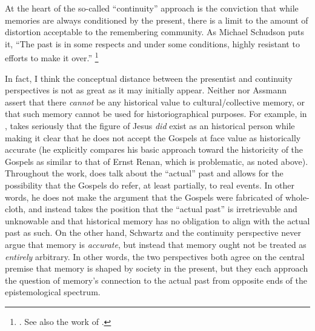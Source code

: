 At the heart of the so-called ``continuity'' approach is the conviction that while memories are always conditioned by the present, there is a limit to the amount of distortion acceptable to the remembering community. As Michael Schudson puts it, ``The past is in some respects and under some conditions, highly resistant to efforts to make it over.''%
    \footnote{%
        \Cite[107]{schudson_communication1989}. See also the work of 
        \cite{molden_ms2016}.}

In fact, I think the conceptual distance between the presentist and continuity perspectives is not as great as it may initially appear. Neither \halbwachs nor Assmann assert that there \emph{cannot} be any historical value to cultural/collective memory, or that such memory cannot be used for historiographical purposes. For example, in , \halbwachs takes seriously that the figure of Jesus \emph{did} exist as an historical person while making it clear that he does not accept the Gospels at face value as historically accurate (he explicitly compares his basic approach toward the historicity of the Gospels as similar to that of Ernst Renan, which is problematic, as noted above).%
    \autocite[205--206]{halbwachs1992}
Throughout the work, \halbwachs does talk about the ``actual'' past and allows for the possibility that the Gospels do refer, at least partially, to real events. In other words, he does not make the argument that the Gospels were fabricated of whole-cloth, and instead takes the position that the ``actual past'' is irretrievable and unknowable and that historical memory has no obligation to align with the actual past as such. On the other hand, Schwartz and the continuity perspective never argue that memory is \emph{accurate}, but instead that memory ought not be treated as \emph{entirely} arbitrary. In other words, the two perspectives both agree on the central premise that memory is shaped by society in the present, but they each approach the question of memory's connection to the actual past from opposite ends of the epistemological spectrum.  

